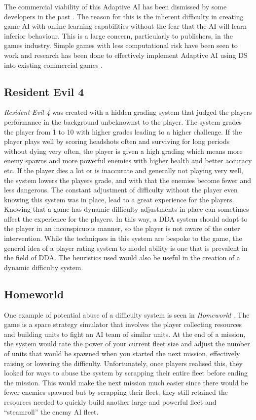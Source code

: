 \documentclass[journal]{IEEEtran}
\begin{document}
The commercial viability of this Adaptive AI has been dismissed by some developers in the past \cite{woodcock2000future} \cite{rabin2004promising}. The reason for this is the inherent difficulty in creating game AI with online learning capabilities without the fear that the AI will learn inferior behaviour. This is a large concern, particularly to publishers, in the games industry. Simple games with less computational risk have been seen to work \cite{demasi2003line} and research has been done to effectively implement Adaptive AI using DS into existing commercial games  \cite{spronck2006adaptive}.

\subsection{Resident Evil 4}
\textit{Resident Evil 4} \cite{game:re4} was created with a hidden grading system that judged the players performance in the background unbeknownst to the player. The system grades the player from 1 to 10 with higher grades leading to a higher challenge. If the player plays well by scoring headshots often and surviving for long periods without dying very often, the player is given a high grading which means more enemy spawns and more powerful enemies with higher health and better accuracy etc. If the player dies a lot or is inaccurate and generally not playing very well, the system lowers the players grade, and with that the enemies become fewer and less dangerous. The constant adjustment of difficulty without the player even knowing this system was in place, lead to a great experience for the players. Knowing that a game has dynamic difficulty adjustments in place can sometimes affect the experience for the players. In this way, a DDA system should adapt to the player in an inconspicuous manner, so the player is not aware of the outer intervention.
While the techniques in this system are bespoke to the game, the general idea of a player rating system to model ability is one that is prevalent in the field of DDA. The heuristics used would also be useful in the creation of a dynamic difficulty system.  

\subsection{Homeworld}
One example of potential abuse of a difficulty system is seen in \textit{Homeworld} \cite{game:homeworld}. The game is a space strategy simulator that involves the player collecting resources and building units to fight an AI team of similar units. At the end of a mission, the system would rate the power of your current fleet size and adjust the number of units that would be spawned when you started the next mission, effectively raising or lowering the difficulty. Unfortunately, once players realised this, they looked for ways to abuse the system by scrapping their entire fleet before ending the mission. This would make the next mission much easier since there would be fewer enemies spawned but by scrapping their fleet, they still retained the resources needed to quickly build another large and powerful fleet and ``steamroll'' the enemy AI fleet.
\end{document}
